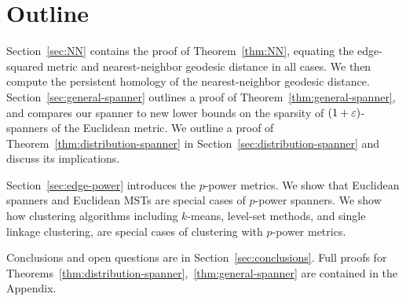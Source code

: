\section{Outline}
%  
Section~\ref{sec:NN} contains the proof of Theorem~\ref{thm:NN},
equating the edge-squared metric and nearest-neighbor geodesic distance in
all cases. We then
compute the persistent homology of the nearest-neighbor
geodesic distance.
Section~\ref{sec:general-spanner} outlines a proof of
Theorem~\ref{thm:general-spanner}, and compares our
spanner to new lower bounds
on the sparsity of $(1+\varepsilon)$-spanners of the Euclidean metric.
We outline a proof of Theorem~\ref{thm:distribution-spanner} in
Section~\ref{sec:distribution-spanner} and discuss its implications.  

Section~\ref{sec:edge-power} introduces the $p$-power metrics. We show
that Euclidean spanners and Euclidean MSTs are special cases of
$p$-power spanners. We show how
clustering algorithms including $k$-means, level-set methods,
and single linkage clustering, are special cases of
clustering with $p$-power metrics.


Conclusions and open questions are in
Section~\ref{sec:conclusions}. Full proofs for
Theorems~\ref{thm:distribution-spanner},~\ref{thm:general-spanner}
are contained in the Appendix.
